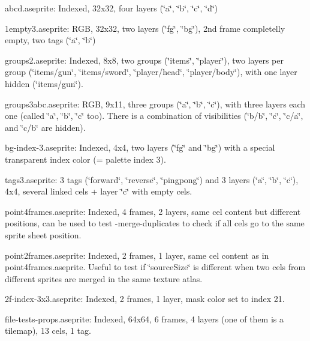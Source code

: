 
\begin{DoxyItemize}
\item {\ttfamily abcd.\+aseprite}\+: Indexed, 32x32, four layers (\char`\"{}a\char`\"{}, \char`\"{}b\char`\"{}, \char`\"{}c\char`\"{}, \char`\"{}d\char`\"{})
\item {\ttfamily 1empty3.\+aseprite}\+: RGB, 32x32, two layers (\char`\"{}fg\char`\"{}, \char`\"{}bg\char`\"{}), 2nd frame completelly empty, two tags (\char`\"{}a\char`\"{}, \char`\"{}b\char`\"{})
\item {\ttfamily groups2.\+aseprite}\+: Indexed, 8x8, two groups (\char`\"{}items\char`\"{}, \char`\"{}player\char`\"{}), two layers per group (\char`\"{}items/gun\char`\"{}, \char`\"{}items/sword\char`\"{}, \char`\"{}player/head\char`\"{}, \char`\"{}player/body\char`\"{}), with one layer hidden (\char`\"{}items/gun\char`\"{}).
\item {\ttfamily groups3abc.\+aseprite}\+: RGB, 9x11, three groups (\char`\"{}a\char`\"{}, \char`\"{}b\char`\"{}, \char`\"{}c\char`\"{}), with three layers each one (called \char`\"{}a\char`\"{}, \char`\"{}b\char`\"{}, \char`\"{}c\char`\"{} too). There is a combination of visibilities (\char`\"{}b/b\char`\"{}, \char`\"{}c\char`\"{}, \char`\"{}c/a\char`\"{}, and \char`\"{}c/b\char`\"{} are hidden).
\item {\ttfamily bg-\/index-\/3.\+aseprite}\+: Indexed, 4x4, two layers (\char`\"{}fg\char`\"{} and \char`\"{}bg\char`\"{}) with a special transparent index color (= palette index 3).
\item {\ttfamily tags3.\+aseprite}\+: 3 tags (\char`\"{}forward\char`\"{}, \char`\"{}reverse\char`\"{}, \char`\"{}pingpong\char`\"{}) and 3 layers (\char`\"{}a\char`\"{}, \char`\"{}b\char`\"{}, \char`\"{}c\char`\"{}), 4x4, several linked cels + layer \char`\"{}c\char`\"{} with empty cels.
\item {\ttfamily point4frames.\+aseprite}\+: Indexed, 4 frames, 2 layers, same cel content but different positions, can be used to test {\ttfamily -\/merge-\/duplicates} to check if all cels go to the same sprite sheet position.
\item {\ttfamily point2frames.\+aseprite}\+: Indexed, 2 frames, 1 layer, same cel content as in {\ttfamily point4frames.\+aseprite}. Useful to test if {\ttfamily \char`\"{}source\+Size\char`\"{}} is different when two cels from different sprites are merged in the same texture atlas.
\item {\ttfamily 2f-\/index-\/3x3.\+aseprite}\+: Indexed, 2 frames, 1 layer, mask color set to index 21.
\item {\ttfamily file-\/tests-\/props.\+aseprite}\+: Indexed, 64x64, 6 frames, 4 layers (one of them is a tilemap), 13 cels, 1 tag. 
\end{DoxyItemize}